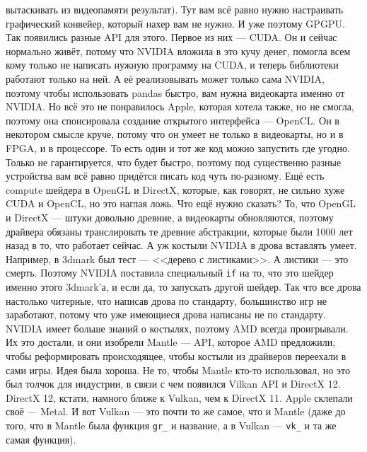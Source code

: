 \documentclass{article}
\begin{document}
вытаскивать из видеопамяти результат). Тут вам всё равно нужно настраивать графический конвейер, который нахер вам не нужно. И уже поэтому GPGPU. Так появились разные API для этого. Первое из них --- CUDA. Он и сейчас нормально живёт, потому что NVIDIA вложила в это кучу денег, помогла всем кому только не написать нужную программу на CUDA, и теперь библиотеки работают только на ней. А её реализовывать может только сама NVIDIA, поэтому чтобы использовать pandas быстро, вам нужна видеокарта именно от NVIDIA. Но всё это не понравилось Apple, которая хотела также, но не смогла, поэтому она спонсировала создание открытого интерфейса --- OpenCL. Он в некотором смысле круче, потому что он умеет не только в видеокарты, но и в FPGA, и в процессоре. То есть один и тот же код можно запустить где угодно. Только не гарантируется, что будет быстро, поэтому под существенно разные устройства вам всё равно придётся писать код чуть по-разному. Ещё есть compute шейдера в OpenGL и DirectX, которые, как говорят, не сильно хуже CUDA и OpenCL, но это наглая ложь. Что ещё нужно сказать? То, что OpenGL и DirectX --- штуки довольно древние, а видеокарты обновляются, поэтому драйвера обязаны транслировать те древние абстракции, которые были 1000 лет назад в то, что работает сейчас. А уж костыли NVIDIA в дрова вставлять умеет. Например, в 3dmark был тест --- <<дерево с листиками>>. А листики --- это смерть. Поэтому NVIDIA поставила специальный \texttt{if} на то, что это шейдер именно этого 3dmark'а, и если да, то запускать другой шейдер. Так что все дрова настолько читерные, что написав дрова по стандарту, большинство игр не заработают, потому что уже имеющиеся дрова написаны не по стандарту. NVIDIA имеет больше знаний о костылях, поэтому AMD всегда проигрывали. Их это достали, и они изобрели Mantle --- API, которое AMD предложили, чтобы реформировать происходящее, чтобы костыли из драйверов переехали в сами игры. Идея была хороша. Не то, чтобы Mantle кто-то использовал, но это был толчок для индустрии, в связи с чем появился Vilkan API и DirectX 12. DirectX 12, кстати, намного ближе к Vulkan, чем к DirectX 11. Apple склепали своё --- Metal. И вот Vulkan --- это почти то же самое, что и Mantle (даже до того, что в Mantle была функция \texttt{gr_} и название, а в Vulkan --- \texttt{vk_} и та же самая функция).\\
\end{document}
